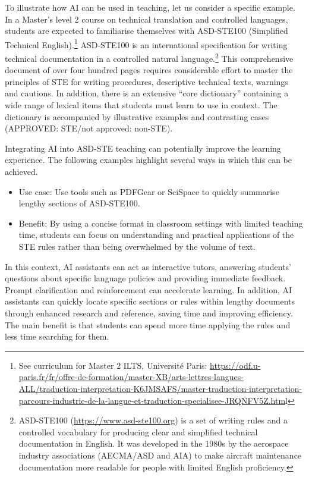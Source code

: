 \documentclass[output=paper]{langscibook}
\begin{document}
To illustrate how AI can be used in teaching, let us consider a specific example. In a Master’s level 2 course on technical translation and controlled languages, students are expected to familiarise themselves with ASD-STE100 (Simplified Technical English).\footnote{{See curriculum for Master 2 ILTS, Université Paris: \url{https://odf.u-paris.fr/fr/offre-de-formation/master-XB/arts-lettres-langues-ALL/traduction-interpretation-K6JMSAFS/master-traduction-interpretation-parcours-industrie-de-la-langue-et-traduction-specialisee-JRQNFV5Z.htm}l}} ASD-STE100 is an international specification for writing technical documentation in a controlled natural language.\footnote{ASD-STE100 (\url{https://www.asd-ste100.org}) is a set of writing rules and a controlled vocabulary for producing clear and simplified technical documentation in English. It was developed in the 1980s by the aerospace industry associations (AECMA/ASD and AIA) to make aircraft maintenance documentation more readable for people with limited English proficiency.} This comprehensive document of over four hundred pages requires considerable effort to master the principles of STE for writing procedures, descriptive technical texts, warnings and cautions. In addition, there is an extensive “core dictionary” containing a wide range of lexical items that students must learn to use in context. The dictionary is accompanied by illustrative examples and contrasting cases (APPROVED: STE/not approved: non-STE).

Integrating AI into ASD-STE teaching can potentially improve the learning experience. The following examples highlight several ways in which this can be achieved.

\begin{itemize}
\item Use case: Use tools such as PDFGear or SciSpace to quickly summarise lengthy sections of ASD-STE100.
\item Benefit: By using a concise format in classroom settings with limited teaching time, students can focus on understanding and practical applications of the STE rules rather than being overwhelmed by the volume of text.
\end{itemize}
In this context, AI assistants can act as interactive tutors, answering students’ questions about specific language policies and providing immediate feedback. Prompt clarification and reinforcement can accelerate learning. In addition, AI assistants can quickly locate specific sections or rules within lengthy documents through enhanced research and reference, saving time and improving efficiency. The main benefit is that students can spend more time applying the rules and less time searching for them.
\end{document}
